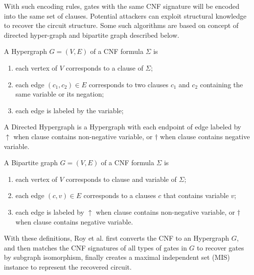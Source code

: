 \documentclass[runningheads,a4paper]{llncs}
\begin{document}
With such encoding rules, 
gates with the same CNF signature will be encoded into the same set of clauses. 
Potential attackers can exploit structural knowledge to recover the circuit structure. 
Some such algorithms\cite{t6,t7,t8,t9} are based on concept of directed hyper-graph and bipartite graph described below.

\begin{definition}
A Hypergraph $G=(V,E)$ of a CNF formula $\Sigma$ is
\begin{enumerate}
 \item each vertex of $V$ corresponds to a clause of $\Sigma$;
 \item each edge $(c_1,c_2)\in E$ corresponds to two clauses $c_1$ and $c_2$ containing the same variable or its negation;
 \item each edge is labeled by the variable;
\end{enumerate}
A Directed Hypergraph is a Hypergraph with each endpoint of edge labeled 
by $\uparrow$ when clause contains non-negative variable,
or $\dag$ when clause contains negative variable.
\end{definition}


 \begin{definition}
 A Bipartite graph $G=(V,E)$ of a CNF formula $\Sigma$ is
\begin{enumerate}
 \item each vertex of $V$ corresponds to clause and variable of $\Sigma$;
 \item each edge $(c,v)\in E$ corresponds to a clauses $c$ that contains variable $v$;
 \item each edge is labeled by  $\uparrow$  when clause contains non-negative variable, or
$\dag$ when clause contains negative variable.
\end{enumerate}
\end{definition}


% 
With these definitions, 
Roy et al. \cite{t8} 
% 
first converts the CNF to an Hypergraph $G$,
and then matches the CNF signatures of all types of gates in $G$ to recover gates by subgraph isomorphism,
finally creates a maximal independent set (MIS) instance to represent the recovered circuit.
\end{document}

